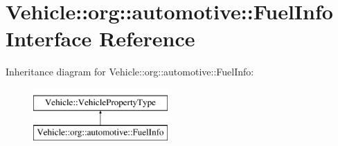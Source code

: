 \hypertarget{interfaceVehicle_1_1org_1_1automotive_1_1FuelInfo}{\section{Vehicle\-:\-:org\-:\-:automotive\-:\-:Fuel\-Info Interface Reference}
\label{interfaceVehicle_1_1org_1_1automotive_1_1FuelInfo}
}
Inheritance diagram for Vehicle\-:\-:org\-:\-:automotive\-:\-:Fuel\-Info\-:\begin{figure}[H]
\begin{center}
\leavevmode
\includegraphics[height=2.000000cm]{interfaceVehicle_1_1org_1_1automotive_1_1FuelInfo}
\end{center}
\end{figure}
